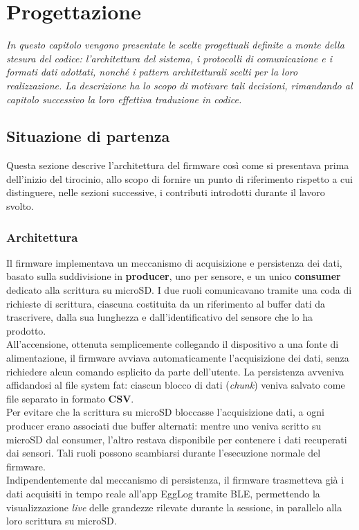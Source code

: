 \chapter{Progettazione}

\textit{In questo capitolo vengono presentate le scelte progettuali definite a monte della stesura del codice:
l'architettura del sistema, i protocolli di comunicazione e i formati dati adottati, nonché i pattern architetturali
scelti per la loro realizzazione. La descrizione ha lo scopo di motivare tali decisioni, rimandando al capitolo
successivo la loro effettiva traduzione in codice.}

\section{Situazione di partenza} \label{sec:situazione-partenza}

Questa sezione descrive l'architettura del firmware così come si presentava prima dell'inizio del tirocinio, allo scopo di fornire un punto
di riferimento rispetto a cui distinguere, nelle sezioni successive, i contributi introdotti durante il lavoro svolto.

\subsection{Architettura}

Il firmware implementava un meccanismo di acquisizione e persistenza dei dati, basato sulla suddivisione in \textbf{producer}, uno per
sensore, e un unico \textbf{consumer} dedicato alla scrittura su microSD. I due ruoli comunicavano tramite una coda di richieste di scrittura,
ciascuna costituita da un riferimento al buffer dati da trascrivere, dalla sua lunghezza e dall'identificativo del sensore che lo ha prodotto.\\
All'accensione, ottenuta semplicemente collegando il dispositivo a una fonte di alimentazione, il firmware avviava automaticamente l'acquisizione 
dei dati, senza richiedere alcun comando esplicito da parte dell'utente. La persistenza avveniva affidandosi al file system \gls{fat}: ciascun blocco
di dati (\emph{chunk}) veniva salvato come file separato in formato \textbf{CSV}.\\
Per evitare che la scrittura su microSD bloccasse l'acquisizione dati, a ogni producer erano associati due buffer alternati:
mentre uno veniva scritto su microSD dal consumer, l'altro restava disponibile per contenere i dati recuperati dai sensori. Tali
ruoli possono scambiarsi durante l'esecuzione normale del firmware. \\
Indipendentemente dal meccanismo di persistenza, il firmware trasmetteva già i dati acquisiti in tempo reale all'app EggLog tramite BLE,
permettendo la visualizzazione \textit{live} delle grandezze rilevate durante la sessione, in parallelo alla loro scrittura su microSD.

